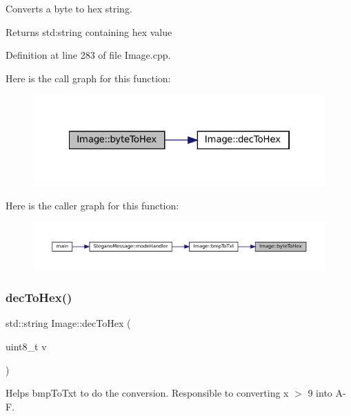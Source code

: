 Converts a byte to hex string. 

\begin{DoxyReturn}{Returns}
std\+:string containing hex value 
\end{DoxyReturn}


Definition at line 283 of file Image.\+cpp.

Here is the call graph for this function\+:\nopagebreak
\begin{figure}[H]
\begin{center}
\leavevmode
\includegraphics[width=322pt]{classImage_ac1c14eba8a20f8bb71c3c21eaba90ecb_cgraph}
\end{center}
\end{figure}
Here is the caller graph for this function\+:\nopagebreak
\begin{figure}[H]
\begin{center}
\leavevmode
\includegraphics[width=350pt]{classImage_ac1c14eba8a20f8bb71c3c21eaba90ecb_icgraph}
\end{center}
\end{figure}
\mbox{\label{classImage_a26f7e0b2649e2529df7e7aea46f2da4a}} 
\subsubsection{\texorpdfstring{decToHex()}{decToHex()}}
{\footnotesize\ttfamily std\+::string Image\+::dec\+To\+Hex (\begin{DoxyParamCaption}\item[{uint8\+\_\+t}]{v }\end{DoxyParamCaption})\hspace{0.3cm}{\ttfamily [static]}}



Helps bmp\+To\+Txt to do the conversion. Responsible to converting x $>$ 9 into A-\/F. 

